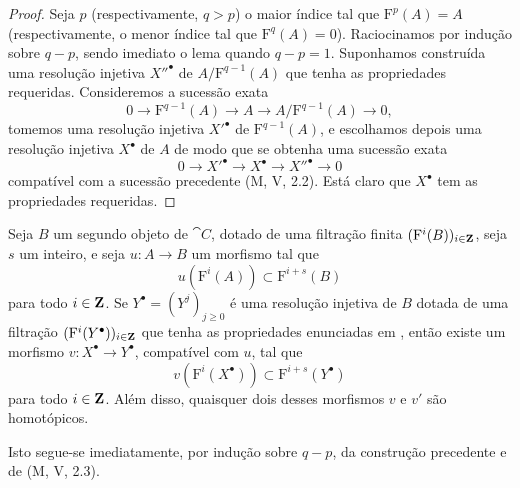\begin{proof}
Seja $p$ (respectivamente, $q>p$) o maior índice tal que
$\mathrm{F}^p(A)=A$ (respectivamente, o menor índice tal que
$\mathrm{F}^q(A)=0$).
Raciocinamos por indução sobre $q-p$, sendo imediato o lema quando
$q-p=1$.
Suponhamos construída uma resolução injetiva ${X''}^\bullet$ de
$A/\mathrm{F}^{q-1}(A)$ que tenha as propriedades requeridas.
Consideremos a sucessão exata
\[
  0\longrightarrow\mathrm{F}^{q-1}(A)
  \longrightarrow A
  \longrightarrow A/\mathrm{F}^{q-1}(A)
  \longrightarrow0,
\]
tomemos uma resolução injetiva ${X'}^\bullet$ de
$\mathrm{F}^{q-1}(A)$, e escolhamos depois uma resolução injetiva
$X^\bullet$ de $A$ de modo que se obtenha uma sucessão exata
\[
  0\longrightarrow {X'}^\bullet
  \longrightarrow X^\bullet
  \longrightarrow {X''}^\bullet
  \longrightarrow0
\]
compatível com a sucessão precedente (M, V, 2.2).
Está claro que $X^\bullet$ tem as propriedades requeridas.
\end{proof}

\begin{corollary}[13.6.3]
\label{0.13.6.3}
Seja $B$ um segundo objeto de $\cat{C}$, dotado de uma filtração
finita $(\mathrm{F}^i(B))_{i\in\mathbf{Z}}$, seja $s$ um inteiro,
e seja $u:A\longrightarrow B$ um morfismo tal que
\[
  u(\mathrm{F}^i(A))\subset\mathrm{F}^{i+s}(B)
\]
para todo $i\in\mathbf{Z}$.
Se $Y^\bullet=(Y^j)_{j\geq0}$ é uma resolução injetiva de $B$
dotada de uma filtração
$(\mathrm{F}^i(Y^\bullet))_{i\in\mathbf{Z}}$ que tenha as propriedades
enunciadas em , então existe um morfismo
$v:X^\bullet\longrightarrow Y^\bullet$, compatível com $u$, tal
que
\[
  v(\mathrm{F}^i(X^\bullet))
  \subset
  \mathrm{F}^{i+s}(Y^\bullet)
\]
para todo $i\in\mathbf{Z}$.
Além disso, quaisquer dois desses morfismos $v$ e $v'$ são homotópicos.
\end{corollary}

Isto segue-se imediatamente, por indução sobre $q-p$, da construção
precedente e de (M, V, 2.3).

